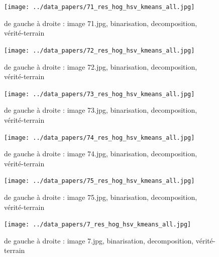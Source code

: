 \documentclass{book}
\begin{document}
\begin{figure}[H]
\begin{center}
\texttt{[image: ../data\_papers/71\_res\_hog\_hsv\_kmeans\_all.jpg]}
\end{center}
\caption{de gauche à droite : image 71.jpg, binarisation, decomposition, vérité-terrain}
\label{71}
\end{figure}
\clearpage


\begin{figure}[H]
\begin{center}
\texttt{[image: ../data\_papers/72\_res\_hog\_hsv\_kmeans\_all.jpg]}
\end{center}
\caption{de gauche à droite : image 72.jpg, binarisation, decomposition, vérité-terrain}
\label{72}
\end{figure}
\clearpage


\begin{figure}[H]
\begin{center}
\texttt{[image: ../data\_papers/73\_res\_hog\_hsv\_kmeans\_all.jpg]}
\end{center}
\caption{de gauche à droite : image 73.jpg, binarisation, decomposition, vérité-terrain}
\label{73}
\end{figure}
\clearpage


\begin{figure}[H]
\begin{center}
\texttt{[image: ../data\_papers/74\_res\_hog\_hsv\_kmeans\_all.jpg]}
\end{center}
\caption{de gauche à droite : image 74.jpg, binarisation, decomposition, vérité-terrain}
\label{74}
\end{figure}
\clearpage


\begin{figure}[H]
\begin{center}
\texttt{[image: ../data\_papers/75\_res\_hog\_hsv\_kmeans\_all.jpg]}
\end{center}
\caption{de gauche à droite : image 75.jpg, binarisation, decomposition, vérité-terrain}
\label{75}
\end{figure}
\clearpage


\begin{figure}[H]
\begin{center}
\texttt{[image: ../data\_papers/7\_res\_hog\_hsv\_kmeans\_all.jpg]}
\end{center}
\caption{de gauche à droite : image 7.jpg, binarisation, decomposition, vérité-terrain}
\label{7}
\end{figure}
\clearpage
\end{document}
